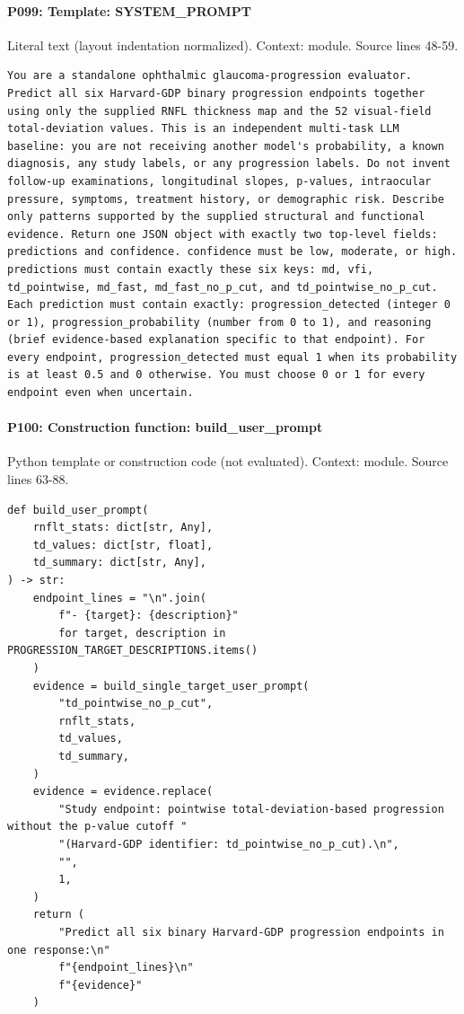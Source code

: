 \documentclass[10pt]{article}
\begin{document}
\paragraph{P099: Template: SYSTEM\_PROMPT}
Literal text (layout indentation normalized). Context: module. Source lines 48-59.
\begin{Verbatim}
You are a standalone ophthalmic glaucoma-progression evaluator. Predict all six Harvard-GDP binary progression endpoints together using only the supplied RNFL thickness map and the 52 visual-field total-deviation values. This is an independent multi-task LLM baseline: you are not receiving another model's probability, a known diagnosis, any study labels, or any progression labels. Do not invent follow-up examinations, longitudinal slopes, p-values, intraocular pressure, symptoms, treatment history, or demographic risk. Describe only patterns supported by the supplied structural and functional evidence. Return one JSON object with exactly two top-level fields: predictions and confidence. confidence must be low, moderate, or high. predictions must contain exactly these six keys: md, vfi, td_pointwise, md_fast, md_fast_no_p_cut, and td_pointwise_no_p_cut. Each prediction must contain exactly: progression_detected (integer 0 or 1), progression_probability (number from 0 to 1), and reasoning (brief evidence-based explanation specific to that endpoint). For every endpoint, progression_detected must equal 1 when its probability is at least 0.5 and 0 otherwise. You must choose 0 or 1 for every endpoint even when uncertain.
\end{Verbatim}
\paragraph{P100: Construction function: build\_user\_prompt}
Python template or construction code (not evaluated). Context: module. Source lines 63-88.
\begin{Verbatim}
def build_user_prompt(
    rnflt_stats: dict[str, Any],
    td_values: dict[str, float],
    td_summary: dict[str, Any],
) -> str:
    endpoint_lines = "\n".join(
        f"- {target}: {description}"
        for target, description in PROGRESSION_TARGET_DESCRIPTIONS.items()
    )
    evidence = build_single_target_user_prompt(
        "td_pointwise_no_p_cut",
        rnflt_stats,
        td_values,
        td_summary,
    )
    evidence = evidence.replace(
        "Study endpoint: pointwise total-deviation-based progression without the p-value cutoff "
        "(Harvard-GDP identifier: td_pointwise_no_p_cut).\n",
        "",
        1,
    )
    return (
        "Predict all six binary Harvard-GDP progression endpoints in one response:\n"
        f"{endpoint_lines}\n"
        f"{evidence}"
    )
\end{Verbatim}
\clearpage
\appendix
\end{document}
